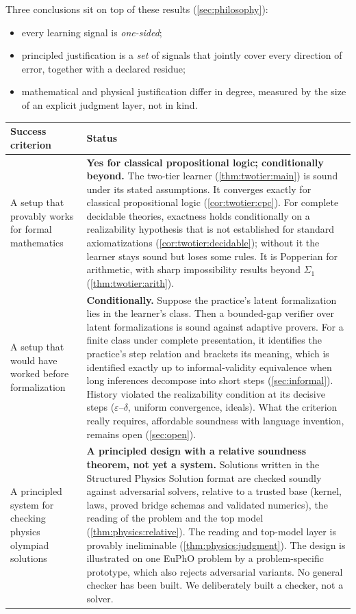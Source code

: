 Three conclusions sit on top of these results (\cref{sec:philosophy}):
\begin{itemize}
\item every learning signal is \emph{one-sided};
\item principled justification is a \emph{set} of signals that jointly cover every direction of error, together with a declared residue;
\item mathematical and physical justification differ in degree, measured by the size of an explicit judgment layer, not in kind.
\end{itemize}

\begin{table}[ht]
\centering\small
\begin{tabularx}{\textwidth}{>{\raggedright\arraybackslash}p{4.2cm}>{\raggedright\arraybackslash}X}
\toprule
Success criterion & Status\\
\midrule
A setup that provably works for formal mathematics & \textbf{Yes for classical propositional logic; conditionally beyond.} The two-tier learner (\cref{thm:twotier:main}) is sound under its stated assumptions. It converges exactly for classical propositional logic (\cref{cor:twotier:cpc}). For complete decidable theories, exactness holds conditionally on a realizability hypothesis that is not established for standard axiomatizations (\cref{cor:twotier:decidable}); without it the learner stays sound but loses some rules. It is Popperian for arithmetic, with sharp impossibility results beyond $\Sigma_1$ (\cref{thm:twotier:arith}).\\
A setup that would have worked before formalization & \textbf{Conditionally.} Suppose the practice's latent formalization lies in the learner's class. Then a bounded-gap verifier over latent formalizations is sound against adaptive provers. For a finite class under complete presentation, it identifies the practice's step relation and brackets its meaning, which is identified exactly up to informal-validity equivalence when long inferences decompose into short steps (\cref{sec:informal}). History violated the realizability condition at its decisive steps ($\varepsilon$--$\delta$, uniform convergence, ideals). What the criterion really requires, affordable soundness with language invention, remains open (\cref{sec:open}).\\
A principled system for checking physics olympiad solutions & \textbf{A principled design with a relative soundness theorem, not yet a system.} Solutions written in the Structured Physics Solution format are checked soundly against adversarial solvers, relative to a trusted base (kernel, laws, proved bridge schemas and validated numerics), the reading of the problem and the top model (\cref{thm:physics:relative}). The reading and top-model layer is provably ineliminable (\cref{thm:physics:judgment}). The design is illustrated on one EuPhO problem by a problem-specific prototype, which also rejects adversarial variants. No general checker has been built. We deliberately built a checker, not a solver.\\

\end{tabularx}
\end{table}
